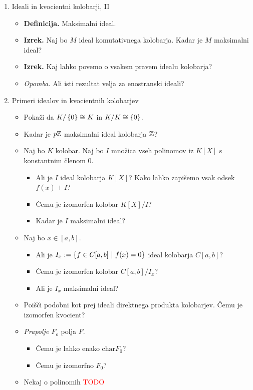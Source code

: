 \begin{enumerate}
    \item Ideali in kvocientni kolobarji, II
    \begin{itemize}
        \item \colorbox{purple!30}{\textbf{Definicija.}} Maksimalni ideal.
        \item \colorbox{blue!30}{\textbf{Izrek.}}  Naj bo $M$ ideal komutativnega kolobarja. Kadar je $M$ maksimalni ideal?
        \item \colorbox{blue!30}{\textbf{Izrek.}} Kaj lahko povemo o vsakem pravem idealu kolobarja?
        \item \colorbox{yellow!30}{\emph{Opomba.}} Ali isti rezultat velja za enostranski ideali?
    \end{itemize}

    \item Primeri idealov in kvocientnih kolobarjev
    \begin{itemize}
        \item Pokaži da $K/ \left\{0\right\} \cong K$ in $K/K \cong \left\{0\right\}$.
        \item Kadar je $p\mathbb{Z}$ maksimalni ideal kolobarja $\mathbb{Z}$?
        \item Naj bo $K$ kolobar. Naj bo $I$ množica vseh polinomov iz $K[X]$ s konstantnim členom $0$.
        \begin{itemize}
            \item Ali je $I$ ideal kolobarja $K[X]$? Kako lahko zapišemo vsak odsek $f(x) + I$?
            \item Čemu je izomorfen kolobar $K[X]/I$?
            \item Kadar je $I$ maksimalni ideal?
        \end{itemize}
        \item Naj bo $x \in [a, b]$.
        \begin{itemize}
            \item Ali je $I_x := \left\{f \in C[a,b] \ | \ f(x) = 0\right\}$ ideal kolobarja $C[a, b]$?
            \item Čemu je izomorfen kolobar $C[a, b]/I_x$?
            \item Ali je $I_x$ maksimalni ideal?
        \end{itemize}
        \item Poišči podobni kot prej ideali direktnega produkta kolobarjev. Čemu je izomorfen kvocient?
        \item \emph{Prapolje $F_o$} polja $F$.
        \begin{itemize}
            \item Čemu je lahko enako $\text{char} F_0$?
            \item Čemu je izomorfno $F_0$?
        \end{itemize}
        \item Nekaj o polinomih \textcolor{red}{TODO}
    \end{itemize}
\end{enumerate}